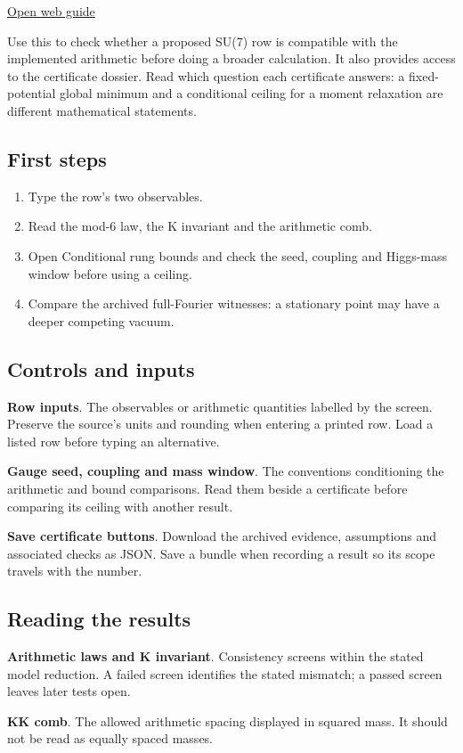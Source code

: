\documentclass[11pt,a4paper]{article}
\begin{document}
\href{https://karlesmarin.github.io/ghu-explorer/guide/screen/index.html}{Open web guide}

Use this to check whether a proposed SU(7) row is compatible with the implemented arithmetic before doing a broader calculation. It also provides access to the certificate dossier. Read which question each certificate answers: a fixed-potential global minimum and a conditional ceiling for a moment relaxation are different mathematical statements.
\subsection*{First steps}
\begin{enumerate}
\item Type the row's two observables.
\item Read the mod-6 law, the K invariant and the arithmetic comb.
\item Open Conditional rung bounds and check the seed, coupling and Higgs-mass window before using a ceiling.
\item Compare the archived full-Fourier witnesses: a stationary point may have a deeper competing vacuum.
\end{enumerate}
\subsection*{Controls and inputs}
\textbf{Row inputs}. The observables or arithmetic quantities labelled by the screen. Preserve the source's units and rounding when entering a printed row. Load a listed row before typing an alternative.

\textbf{Gauge seed, coupling and mass window}. The conventions conditioning the arithmetic and bound comparisons. Read them beside a certificate before comparing its ceiling with another result.

\textbf{Save certificate buttons}. Download the archived evidence, assumptions and associated checks as JSON. Save a bundle when recording a result so its scope travels with the number.

\subsection*{Reading the results}
\textbf{Arithmetic laws and K invariant}. Consistency screens within the stated model reduction. A failed screen identifies the stated mismatch; a passed screen leaves later tests open.

\textbf{KK comb}. The allowed arithmetic spacing displayed in squared mass. It should not be read as equally spaced masses.
\end{document}
